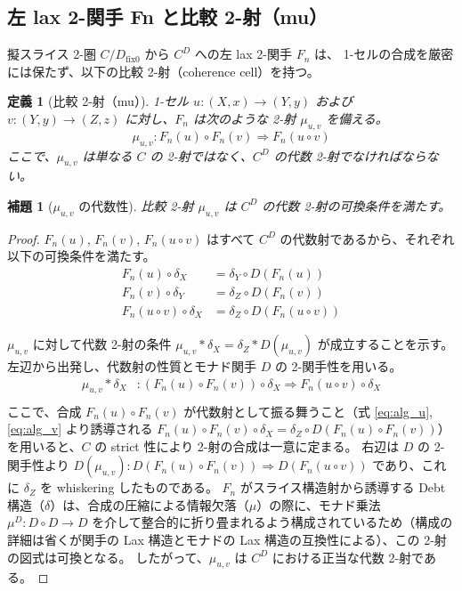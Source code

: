 \documentclass[a4paper,11pt]{ltjsarticle}
\newtheorem{definition}{定義}[section]
\newtheorem{lemma}{補題}[section]
\begin{document}
\subsection[左 lax 2-関手 Fn と比較 2-射（mu）]{左 lax 2-関手 Fn と比較 2-射（mu）}

擬スライス 2-圏 $C/D_{\mathrm{fix}0}$ から $C^D$ への左 lax 2-関手 $F_n$ は、
1-セルの合成を厳密には保たず、以下の比較 2-射（coherence cell）を持つ。

\begin{definition}[比較 2-射（mu）]
1-セル $u: (X, x) \to (Y, y)$ および $v: (Y, y) \to (Z, z)$ に対し、$F_n$ は次のような 2-射 $\mu_{u,v}$ を備える。
\[
  \mu_{u,v} : F_n(u) \circ F_n(v) \Longrightarrow F_n(u \circ v)
\]
ここで、$\mu_{u,v}$ は単なる $C$ の 2-射ではなく、$C^D$ の代数 2-射でなければならない。
\end{definition}

\begin{lemma}[$\mu_{u,v}$ の代数性]
比較 2-射 $\mu_{u,v}$ は $C^D$ の代数 2-射の可換条件を満たす。
\end{lemma}

\begin{proof}
$F_n(u)$, $F_n(v)$, $F_n(u \circ v)$ はすべて $C^D$ の代数射であるから、それぞれ以下の可換条件を満たす。
\begin{align}
  F_n(u) \circ \delta_X &= \delta_Y \circ D(F_n(u)) \label{eq:alg_u} \\
  F_n(v) \circ \delta_Y &= \delta_Z \circ D(F_n(v)) \label{eq:alg_v} \\
  F_n(u \circ v) \circ \delta_X &= \delta_Z \circ D(F_n(u \circ v)) \label{eq:alg_uv}
\end{align}

$\mu_{u,v}$ に対して代数 2-射の条件 $\mu_{u,v} * \delta_X = \delta_Z * D(\mu_{u,v})$ が成立することを示す。
左辺から出発し、代数射の性質とモナド関手 $D$ の 2-関手性を用いる。
\begin{align*}
  \mu_{u,v} * \delta_X 
  &: (F_n(u) \circ F_n(v)) \circ \delta_X \Longrightarrow F_n(u \circ v) \circ \delta_X \\
\end{align*}
ここで、合成 $F_n(u) \circ F_n(v)$ が代数射として振る舞うこと（式 \ref{eq:alg_u}, \ref{eq:alg_v} より誘導される $F_n(u) \circ F_n(v) \circ \delta_X = \delta_Z \circ D(F_n(u) \circ F_n(v))$）を用いると、$C$ の strict 性により 2-射の合成は一意に定まる。
右辺は $D$ の 2-関手性より $D(\mu_{u,v}): D(F_n(u) \circ F_n(v)) \Rightarrow D(F_n(u \circ v))$ であり、これに $\delta_Z$ を whiskering したものである。
$F_n$ がスライス構造射から誘導する Debt 構造（$\delta$）は、合成の圧縮による情報欠落（$\mu$）の際に、モナド乗法 $\mu^D: D \circ D \to D$ を介して整合的に折り畳まれるよう構成されているため（構成の詳細は省くが関手の Lax 構造とモナドの Lax 構造の互換性による）、この 2-射の図式は可換となる。
したがって、$\mu_{u,v}$ は $C^D$ における正当な代数 2-射である。
\end{proof}
\end{document}
